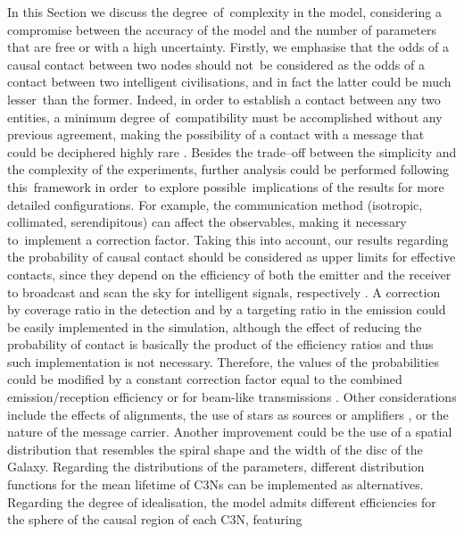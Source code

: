 \documentclass[crop]{CSLB}
\newcommand{\ceti}{C3N}
\newcommand{\cetis}{C3Ns}
\begin{document}
In this Section we discuss the degree of complexity in the model, considering a
compromise between the accuracy of the model and the number of parameters that
are free or with a high uncertainty.
%
Firstly, we emphasise that the odds of a causal contact between two nodes
should not be considered as the odds of a contact between two intelligent
civilisations, and in fact the latter could be much lesser than the former.
%
Indeed, in order to establish a contact between any two entities, a minimum
degree of compatibility must be accomplished without any previous agreement,
making the possibility of a contact with a message that could be deciphered
highly rare \citep[see e.g. ][]{forgan_collimated_2014}.
%
Besides the trade--off between the simplicity and the complexity of the
experiments, further analysis could be performed following this framework in
order to explore possible implications of the results for more detailed
configurations.
%
For example, the communication method (isotropic, collimated, serendipitous)
can affect the observables, making it necessary to implement a correction
factor.
%
Taking this into account, our results regarding the probability of causal
contact should be considered as upper limits for effective contacts, since they
depend on the efficiency of both the emitter and the receiver to broadcast and
scan the sky for intelligent signals, respectively
\citep{grimaldi_signal_2017}.
%
A correction by coverage ratio in the detection and by a targeting ratio in the
emission could be easily implemented in the simulation, although the effect of
reducing the probability of contact is basically the product of the efficiency
ratios and thus such implementation is not necessary.
%
Therefore, the values of the probabilities could be modified by a constant
correction factor equal to the combined emission/reception efficiency
\citep{smith_broadcasting_2009, anchordoqui_upper_2019, forgan_collimated_2014}
or for beam-like transmissions \citep{grimaldi_signal_2017}. 
%
Other considerations include the effects of alignments, the use of stars as
sources or amplifiers \citep{Edmondson2003, borra_searching_2012}, or the
nature of the message carrier.
%
Another improvement could be the use of a spatial distribution that resembles
the spiral shape and the width of the disc of the Galaxy.
%
Regarding the distributions of the parameters, different distribution functions
for the mean lifetime of \cetis{} can be implemented as alternatives.
%
Regarding the degree of idealisation, the model admits different
efficiencies for the sphere of the causal region of each \ceti{}, featuring
\end{document}
